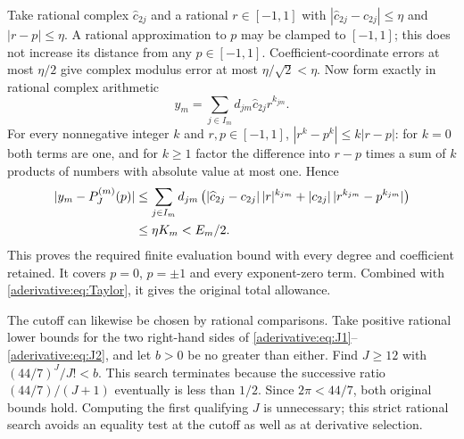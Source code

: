 Take rational complex $\widehat c_{2j}$ and a rational
$r\in[-1,1]$ with
$|\widehat c_{2j}-c_{2j}|\le\eta$ and $|r-p|\le\eta$.
A rational approximation to $p$ may be clamped to $[-1,1]$;
this does not increase its distance from any $p\in[-1,1]$.
Coefficient-coordinate errors at most $\eta/2$ give
complex modulus error at most $\eta/\sqrt2<\eta$.
Now form exactly in rational complex arithmetic
\begin{equation}\label{aderivative:eq:rationaloutput}
y_m=\sum_{j\in I_m}d_{jm}\widehat c_{2j}r^{k_{jm}}.
\end{equation}
For every nonnegative integer $k$ and $r,p\in[-1,1]$,
$|r^k-p^k|\le k|r-p|$: for $k=0$ both terms are one,
and for $k\ge1$ factor the difference into $r-p$ times
a sum of $k$ products of numbers with absolute value at
most one. Hence
\begin{align}
|y_m-P_J^{(m)}(p)|
&\le\sum_{j\in I_m}d_{jm}
\left(|\widehat c_{2j}-c_{2j}|\,|r|^{k_{jm}}
+|c_{2j}|\,|r^{k_{jm}}-p^{k_{jm}}|\right)\notag\\
&\le\eta K_m<E_m/2.\label{aderivative:eq:evaluationbound}
\end{align}
This proves the required finite evaluation bound with
every degree and coefficient retained. It covers $p=0$,
$p=\pm1$ and every exponent-zero term. Combined with
\eqref{aderivative:eq:Taylor}, it gives the original total allowance.

The cutoff can likewise be chosen by rational comparisons.
Take positive rational lower bounds for the two right-hand
sides of \eqref{aderivative:eq:J1}--\eqref{aderivative:eq:J2}, and let $b>0$ be
no greater than either. Find $J\ge12$ with
$(44/7)^J/J!<b$. This search terminates because the
successive ratio $(44/7)/(J+1)$ eventually is less than
$1/2$. Since $2\pi<44/7$, both original bounds hold.
Computing the first qualifying $J$ is unnecessary; this
strict rational search avoids an equality test at the
cutoff as well as at derivative selection.

